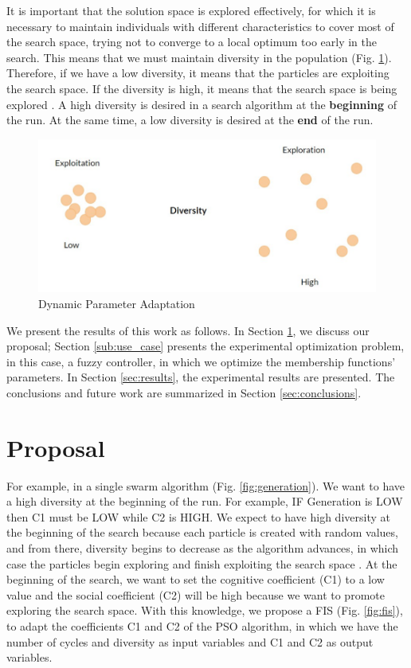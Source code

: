 \documentclass[runningheads]{llncs}
\begin{document}
It is important that the solution space is explored effectively, for which it is necessary to maintain individuals with different characteristics to cover most of the search space, trying not to converge to a local optimum too early in the search. This means that we must maintain diversity in the population (Fig. \ref{fig:diversity}). Therefore, if we have a low diversity, it means that the particles are exploiting the search space. If the diversity is high, it means that the search space is being explored \cite{wang2013diversity}. A high diversity is desired in a search algorithm at the \textbf{beginning} of the run. At the same time, a low diversity is desired at the \textbf{end} of the run.

\begin{figure} [htbp]
  \centering
  \includegraphics[angle=0,width=1\textwidth]{diversity}
  \caption{Dynamic Parameter Adaptation}
  \label{fig:diversity} 
\end{figure}

We present the results of this work as follows. In Section \ref{sec:proposal}, we discuss our proposal; Section \ref{sub:use_case} presents the experimental optimization problem, in this case, a fuzzy controller, in which we optimize the membership functions' parameters. In Section \ref{sec:results}, the experimental results are presented. The conclusions and future work are summarized in Section \ref{sec:conclusions}.

\section{Proposal}\label{sec:proposal}

For example, in a single swarm algorithm (Fig. \ref{fig:generation}). We want to have a high diversity at the beginning of the run. For example, IF Generation is LOW then C1 must be LOW while C2 is HIGH. We expect to have high diversity at the beginning of the search because each particle is created with random values, and from there, diversity begins to decrease as the algorithm advances, in which case the particles begin exploring and finish exploiting the search space \cite{cheng2011diversity}. At the beginning of the search, we want to set the cognitive coefficient (C1) to a low value and the social coefficient (C2) will be high because we want to promote exploring the search space. With this knowledge, we propose a FIS (Fig. \ref{fig:fis}), to adapt the coefficients C1 and C2 of the PSO algorithm, in which we have the number of cycles
and diversity as input variables and C1 and C2 as output variables.
\end{document}
